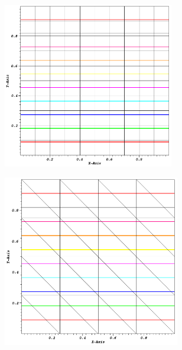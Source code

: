\begin{figure}
\centering
	\begin{subfigure}[b]{0.5\textwidth}
		\centering
		\includegraphics[width=0.82\textwidth]{figures/sec_DSA/SIP_cart_lin_contour.png}
		\caption{}
	\end{subfigure}
	\vfill
	\begin{subfigure}[b]{0.45\textwidth}
		\centering
		\includegraphics[width=0.85\textwidth]{figures/sec_DSA/SIP_tri_lin_contour.png}
		\caption{}
	\end{subfigure}
	\hfill
	\begin{subfigure}[b]{0.45\textwidth}

\end{subfigure}
\end{figure}
